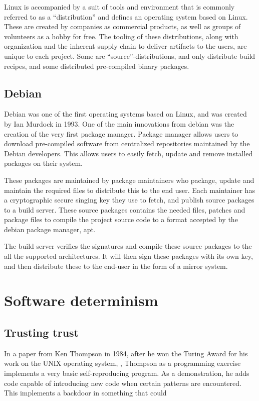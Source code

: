 \documentclass[../Main/thesis.tex]{subfiles}
\begin{document}
Linux is accompanied by a suit of tools and environment that is commonly
referred to as a ``distribution'' and defines an operating system based on
Linux. These are created by companies as commercial products, as well as groups
of volunteers as a hobby for free. The tooling of these distributions, along
with organization and the inherent supply chain to deliver artifacts to the
users, are unique to each project. Some are ``source''-distributions, and only
distribute build recipes, and some distributed pre-compiled binary packages.


\subsection*{Debian}
Debian was one of the first operating systems based on Linux, and was created by
Ian Murdock in 1993. One of the main innovations from debian was the creation of
the very first package manager. Package manager allows users to download
pre-compiled software from centralized repositories maintained by the Debian
developers. This allows users to easily fetch, update and remove installed
packages on their system.

These packages are maintained by package maintainers who package, update and
maintain the required files to distribute this to the end user. Each maintainer
has a cryptographic secure singing key they use to fetch, and publish source
packages to a build server. These source packages contains the needed files,
patches and package files to compile the project source code to a format
accepted by the debian package manager, apt.

The build server verifies the signatures and compile these source packages to
the all the supported architectures. It will then sign these packages with its
own key, and then distribute these to the end-user in the form of a mirror
system.


\section{Software determinism}\label{sec:reproducible_builds}


\subsection*{Trusting trust}
In a paper from Ken Thompson in 1984, after he won the Turing Award for his work
on the UNIX operating system, , Thompson as a
programming exercise implements a very basic self-reproducing program. As a
demonstration, he adds code capable of introducing new code when certain
patterns are encountered. This implements a backdoor in something that could
\end{document}
